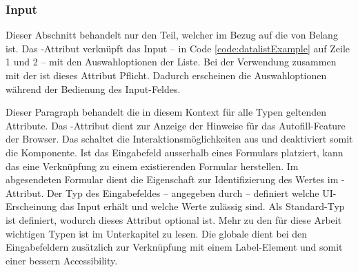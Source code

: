 \subsubsection{\color{dblue} \color{dgray} Input}
\label{sec:input}

Dieser Abschnitt behandelt nur den Teil, welcher im Bezug auf die  von Belang ist. 
Das -Attribut verknüpft das Input – in Code \ref{code:datalistExample} auf Zeile 1 und 2 – mit den Auswahloptionen der Liste. 
Bei der Verwendung zusammen mit der  ist dieses Attribut Pflicht. 
Dadurch erscheinen die Auswahloptionen während der Bedienung des Input-Feldes. 

Dieser Paragraph behandelt die in diesem Kontext für alle Typen geltenden Attribute. 
Das -Attribut dient zur Anzeige der Hinweise für das Autofill-Feature der Browser. 
Das  schaltet die Interaktionsmöglichkeiten aus und deaktiviert somit die Komponente. 
Ist das Eingabefeld ausserhalb eines Formulars platziert, kann das  eine Verknüpfung zu einem existierenden Formular herstellen. 
Im abgesendeten Formular dient die Eigenschaft  zur Identifizierung des Wertes im -Attribut. 
Der Typ des Eingabefeldes – angegeben durch  – definiert welche UI-Erscheinung das Input erhält und welche Werte zulässig sind. 
Als Standard-Typ ist  definiert, wodurch dieses Attribut optional ist. 
Mehr zu den für diese Arbeit wichtigen Typen ist im Unterkapitel \textbf{} zu lesen. 
Die globale  dient bei den Eingabefeldern zusätzlich zur Verknüpfung mit einem Label-Element und somit einer bessern Accessibility. 

